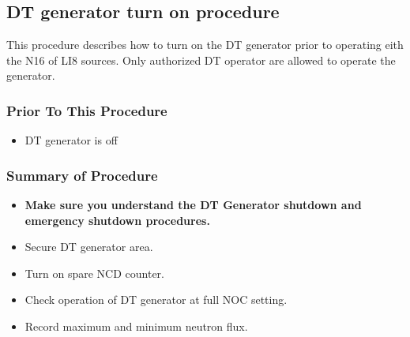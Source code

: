 \pagebreak
\subsection{ DT generator turn on procedure}

This procedure describes how to turn on the DT generator prior to operating eith the N16 of LI8 sources. Only authorized DT operator are allowed to operate the generator.
\subsubsection{Prior To This Procedure}
\begin{itemize}
\item \CheckBox[name=dttop01]{} DT generator is off
\end{itemize}
\subsubsection{Summary of Procedure}
\begin{itemize}
\item \CheckBox[name=dttop02]{} {\bf Make sure you understand the DT Generator shutdown and emergency shutdown procedures.}
\item \CheckBox[name=dttop03]{} Secure DT generator area.
\item \CheckBox[name=dttop04]{} Turn on spare NCD counter.
\item \CheckBox[name=dttop05]{} Check operation of DT generator at full NOC setting.
\item \CheckBox[name=dttop06]{} Record maximum and minimum neutron flux.
\end{itemize}

